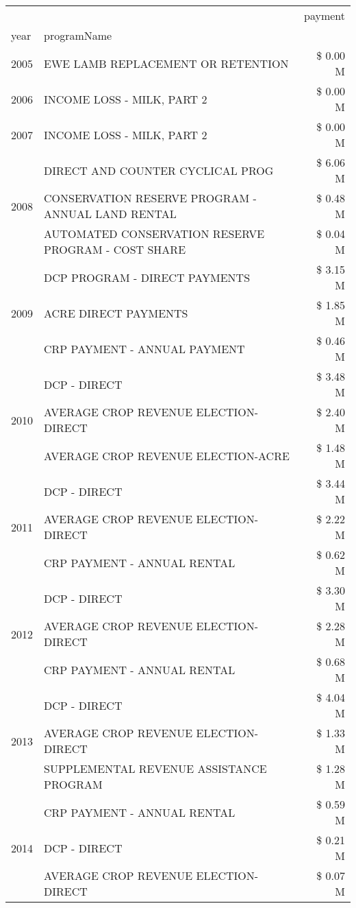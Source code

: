 \begin{tabular}{llr}
\toprule
 &  & payment \\
year & programName &  \\
\midrule
2005 & EWE LAMB REPLACEMENT OR RETENTION & \$ 0.00 M \\
\cline{1-3}
2006 & INCOME LOSS - MILK, PART 2 & \$ 0.00 M \\
\cline{1-3}
2007 & INCOME LOSS - MILK, PART 2 & \$ 0.00 M \\
\cline{1-3}
\multirow[t]{3}{*}{2008} & DIRECT AND COUNTER CYCLICAL PROG & \$ 6.06 M \\
 & CONSERVATION RESERVE PROGRAM - ANNUAL LAND RENTAL & \$ 0.48 M \\
 & AUTOMATED CONSERVATION RESERVE PROGRAM - COST SHARE & \$ 0.04 M \\
\cline{1-3}
\multirow[t]{3}{*}{2009} & DCP PROGRAM - DIRECT PAYMENTS & \$ 3.15 M \\
 & ACRE DIRECT PAYMENTS & \$ 1.85 M \\
 & CRP PAYMENT - ANNUAL PAYMENT & \$ 0.46 M \\
\cline{1-3}
\multirow[t]{3}{*}{2010} & DCP - DIRECT & \$ 3.48 M \\
 & AVERAGE CROP REVENUE ELECTION-DIRECT & \$ 2.40 M \\
 & AVERAGE CROP REVENUE ELECTION-ACRE & \$ 1.48 M \\
\cline{1-3}
\multirow[t]{3}{*}{2011} & DCP - DIRECT & \$ 3.44 M \\
 & AVERAGE CROP REVENUE ELECTION-DIRECT & \$ 2.22 M \\
 & CRP PAYMENT - ANNUAL RENTAL & \$ 0.62 M \\
\cline{1-3}
\multirow[t]{3}{*}{2012} & DCP - DIRECT & \$ 3.30 M \\
 & AVERAGE CROP REVENUE ELECTION-DIRECT & \$ 2.28 M \\
 & CRP PAYMENT - ANNUAL RENTAL & \$ 0.68 M \\
\cline{1-3}
\multirow[t]{3}{*}{2013} & DCP - DIRECT & \$ 4.04 M \\
 & AVERAGE CROP REVENUE ELECTION-DIRECT & \$ 1.33 M \\
 & SUPPLEMENTAL REVENUE ASSISTANCE PROGRAM & \$ 1.28 M \\
\cline{1-3}
\multirow[t]{3}{*}{2014} & CRP PAYMENT - ANNUAL RENTAL & \$ 0.59 M \\
 & DCP - DIRECT & \$ 0.21 M \\
 & AVERAGE CROP REVENUE ELECTION-DIRECT & \$ 0.07 M \\
\cline{1-3}

\end{tabular}

